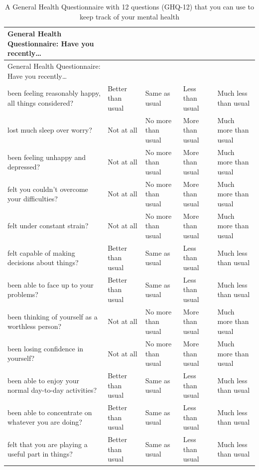 \documentclass[
]{krantz}
\begin{document}
\begin{longtable}[]{@{}
  >{\raggedright\arraybackslash}p{}
  >{\raggedright\arraybackslash}p{}
  >{\raggedright\arraybackslash}p{}
  >{\raggedright\arraybackslash}p{}
  >{\raggedright\arraybackslash}p{}@{}}
\caption{\label{tab:GHQ} A General Health Questionnaire with 12 questions (GHQ-12) that you can use to keep track of your mental health}\tabularnewline
\toprule
General Health Questionnaire: Have you recently\ldots{} & 0 & 1 & 2 & 3 \\
\midrule
\endfirsthead
\toprule
General Health Questionnaire: Have you recently\ldots{} & 0 & 1 & 2 & 3 \\
\midrule
\endhead
been feeling reasonably happy, all things considered? & Better than usual & Same as usual & Less than usual & Much less than usual \\
lost much sleep over worry? & Not at all & No more than usual & More than usual & Much more than usual \\
been feeling unhappy and depressed? & Not at all & No more than usual & More than usual & Much more than usual \\
felt you couldn't overcome your difficulties? & Not at all & No more than usual & More than usual & Much more than usual \\
felt under constant strain? & Not at all & No more than usual & More than usual & Much more than usual \\
felt capable of making decisions about things? & Better than usual & Same as usual & Less than usual & Much less than usual \\
been able to face up to your problems? & Better than usual & Same as usual & Less than usual & Much less than usual \\
been thinking of yourself as a worthless person? & Not at all & No more than usual & More than usual & Much more than usual \\
been losing confidence in yourself? & Not at all & No more than usual & More than usual & Much more than usual \\
been able to enjoy your normal day-to-day activities? & Better than usual & Same as usual & Less than usual & Much less than usual \\
been able to concentrate on whatever you are doing? & Better than usual & Same as usual & Less than usual & Much less than usual \\
felt that you are playing a useful part in things? & Better than usual & Same as usual & Less than usual & Much less than usual \\
\bottomrule
\end{longtable}
\end{document}
